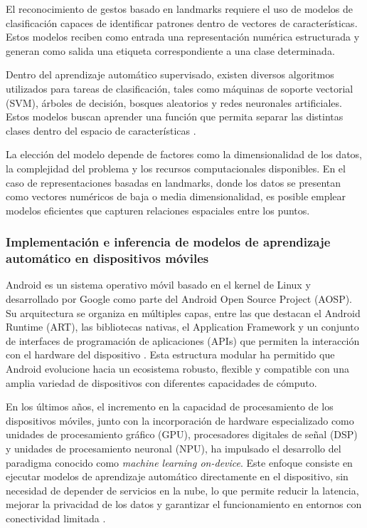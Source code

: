 	El reconocimiento de gestos basado en landmarks requiere el uso de modelos de clasificación capaces de identificar patrones dentro de vectores de características. Estos modelos reciben como entrada una representación numérica estructurada y generan como salida una etiqueta correspondiente a una clase determinada.
	
	Dentro del aprendizaje automático supervisado, existen diversos algoritmos utilizados para tareas de clasificación, tales como máquinas de soporte vectorial (SVM), árboles de decisión, bosques aleatorios y redes neuronales artificiales. Estos modelos buscan aprender una función que permita separar las distintas clases dentro del espacio de características \cite{bishop2006pattern}.
	
	La elección del modelo depende de factores como la dimensionalidad de los datos, la complejidad del problema y los recursos computacionales disponibles. En el caso de representaciones basadas en landmarks, donde los datos se presentan como vectores numéricos de baja o media dimensionalidad, es posible emplear modelos eficientes que capturen relaciones espaciales entre los puntos.
	
	
	\subsubsection{Implementación e inferencia de modelos de aprendizaje automático en dispositivos móviles}

	Android es un sistema operativo móvil basado en el kernel de Linux y desarrollado por Google como parte del Android Open Source Project (AOSP). Su arquitectura se organiza en múltiples capas, entre las que destacan el Android Runtime (ART), las bibliotecas nativas, el Application Framework y un conjunto de interfaces de programación de aplicaciones (APIs) que permiten la interacción con el hardware del dispositivo \cite{android_architecture}. Esta estructura modular ha permitido que Android evolucione hacia un ecosistema robusto, flexible y compatible con una amplia variedad de dispositivos con diferentes capacidades de cómputo.
	
	En los últimos años, el incremento en la capacidad de procesamiento de los dispositivos móviles, junto con la incorporación de hardware especializado como unidades de procesamiento gráfico (GPU), procesadores digitales de señal (DSP) y unidades de procesamiento neuronal (NPU), ha impulsado el desarrollo del paradigma conocido como \textit{machine learning on-device}. Este enfoque consiste en ejecutar modelos de aprendizaje automático directamente en el dispositivo, sin necesidad de depender de servicios en la nube, lo que permite reducir la latencia, mejorar la privacidad de los datos y garantizar el funcionamiento en entornos con conectividad limitada \cite{wu2019machine}.
	
